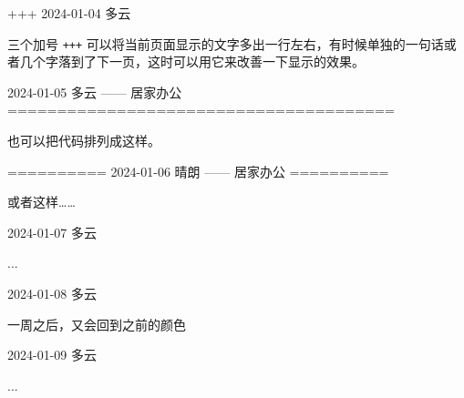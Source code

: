 \documentclass[11pt, paperstyle=light yellow, color entry,
  title in boldface, title in sffamily, use style = classical]{jwjournal}
\begin{document}
+++
2024-01-04  多云

  三个加号 \texttt{+++} 可以将当前页面显示的文字多出一行左右，有时候单独的一句话或者几个字落到了下一页，这时可以用它来改善一下显示的效果。



2024-01-05    多云        —— 居家办公
=======================================

也可以把代码排列成这样。


==========
2024-01-06    晴朗        —— 居家办公
==========

或者这样……



2024-01-07  多云

  ...



2024-01-08  多云

  一周之后，又会回到之前的颜色



2024-01-09  多云

  ...
\end{document}
